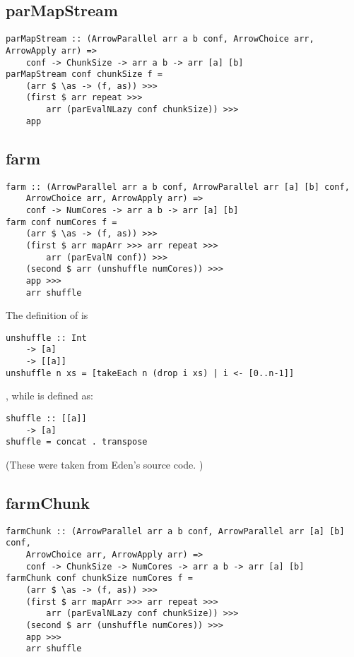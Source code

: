 \frbreak

\subsection{parMapStream}
\begin{lstlisting}[frame=htrbl]
parMapStream :: (ArrowParallel arr a b conf, ArrowChoice arr, ArrowApply arr) =>
	conf -> ChunkSize -> arr a b -> arr [a] [b]
parMapStream conf chunkSize f =
	(arr $ \as -> (f, as)) >>>
	(first $ arr repeat >>>
		arr (parEvalNLazy conf chunkSize)) >>>
	app
\end{lstlisting}

\frbreak
\subsection{farm}
\begin{lstlisting}[frame=htrbl]
farm :: (ArrowParallel arr a b conf, ArrowParallel arr [a] [b] conf,
	ArrowChoice arr, ArrowApply arr) =>
	conf -> NumCores -> arr a b -> arr [a] [b]
farm conf numCores f =
	(arr $ \as -> (f, as)) >>>
	(first $ arr mapArr >>> arr repeat >>>
		arr (parEvalN conf)) >>>
	(second $ arr (unshuffle numCores)) >>>
	app >>>
	arr shuffle
\end{lstlisting}
The definition of  is
\begin{lstlisting}[frame=htrbl]
unshuffle :: Int
	-> [a]
	-> [[a]]
unshuffle n xs = [takeEach n (drop i xs) | i <- [0..n-1]]
\end{lstlisting}
, while  is defined as:
\begin{lstlisting}[frame=htrbl]
shuffle :: [[a]]
	-> [a]
shuffle = concat . transpose
\end{lstlisting}
(These were taken from Eden's source code. \cite{eden_skel_shuffle})

\frbreak

\subsection{farmChunk}
\begin{lstlisting}[frame=htrbl]
farmChunk :: (ArrowParallel arr a b conf, ArrowParallel arr [a] [b] conf,
	ArrowChoice arr, ArrowApply arr) =>
	conf -> ChunkSize -> NumCores -> arr a b -> arr [a] [b]
farmChunk conf chunkSize numCores f =
	(arr $ \as -> (f, as)) >>>
	(first $ arr mapArr >>> arr repeat >>>
		arr (parEvalNLazy conf chunkSize)) >>>
	(second $ arr (unshuffle numCores)) >>>
	app >>>
	arr shuffle
\end{lstlisting}